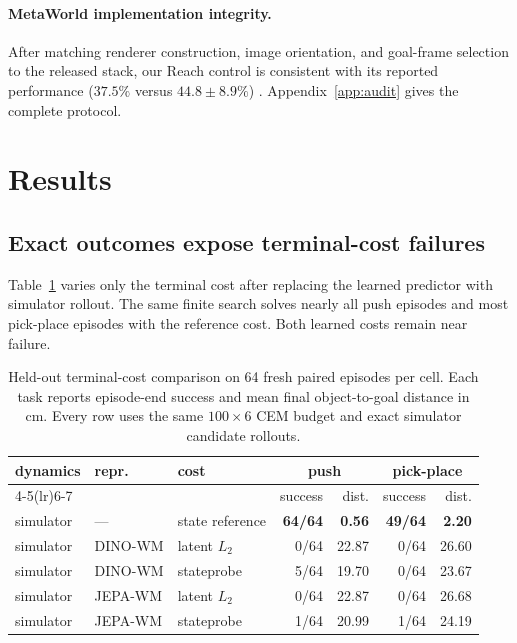 \documentclass[10pt]{article}
\begin{document}
\paragraph{MetaWorld implementation integrity.}
After matching renderer construction, image orientation, and goal-frame
selection to the released stack, our Reach control is consistent with its
reported performance ($37.5\%$ versus $44.8\pm8.9\%$)
\citep{jepawms2025}. Appendix~\ref{app:audit} gives the complete protocol.

\section{Results}\label{sec:results}

\subsection{Exact outcomes expose terminal-cost failures}

Table~\ref{tab:costcomparison} varies only the terminal cost after replacing the learned
predictor with simulator rollout. The same finite search solves nearly all push
episodes and most pick-place episodes with the reference cost. Both
learned costs remain near failure.

\begin{table}[H]
\centering
\footnotesize
\caption{Held-out terminal-cost comparison on 64 fresh paired episodes per cell.
Each task reports episode-end success and mean final object-to-goal distance
in cm. Every row uses the same $100\times6$ CEM budget and exact simulator
candidate rollouts.}
\label{tab:costcomparison}
\begin{tabular}{lllrrrr}
\toprule
dynamics & repr. & cost & \multicolumn{2}{c}{push} &
\multicolumn{2}{c}{pick-place} \\
\cmidrule(lr){4-5}\cmidrule(lr){6-7}
 & & & success & dist. & success & dist. \\
\midrule
simulator & --- & state reference & \textbf{64/64} & \textbf{0.56} &
\textbf{49/64} & \textbf{2.20} \\
simulator & DINO-WM & latent $L_2$ & 0/64 & 22.87 & 0/64 & 26.60 \\
simulator & DINO-WM & stateprobe & 5/64 & 19.70 & 0/64 & 23.67 \\
simulator & JEPA-WM & latent $L_2$ & 0/64 & 22.87 & 0/64 & 26.68 \\
simulator & JEPA-WM & stateprobe & 1/64 & 20.99 & 1/64 & 24.19 \\
\bottomrule
\end{tabular}
\end{table}
\end{document}
